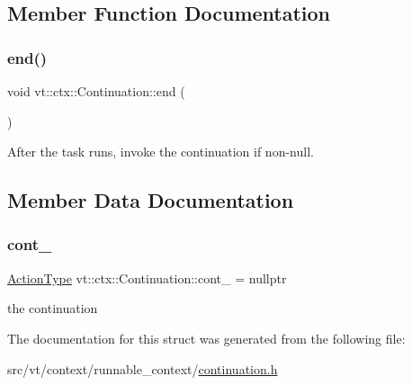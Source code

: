 \subsection{Member Function Documentation}
\mbox{\label{structvt_1_1ctx_1_1_continuation_abcfde5b28c25935a54d42a2aa5ba7de1}} 
\subsubsection{\texorpdfstring{end()}{end()}}
{\footnotesize\ttfamily void vt\+::ctx\+::\+Continuation\+::end (\begin{DoxyParamCaption}{ }\end{DoxyParamCaption})\hspace{0.3cm}{\ttfamily [inline]}}



After the task runs, invoke the continuation if non-\/null. 



\subsection{Member Data Documentation}
\mbox{\label{structvt_1_1ctx_1_1_continuation_aadaa0a147af8e8bba30684a098a5eb39}} 
\subsubsection{\texorpdfstring{cont\+\_\+}{cont\_}}
{\footnotesize\ttfamily \hyperlink{namespacevt_ae0a5a7b18cc99d7b732cb4d44f46b0f3}{Action\+Type} vt\+::ctx\+::\+Continuation\+::cont\+\_\+ = nullptr\hspace{0.3cm}{\ttfamily [private]}}

the continuation 

The documentation for this struct was generated from the following file\+:\begin{DoxyCompactItemize}
\item 
src/vt/context/runnable\+\_\+context/\hyperlink{continuation_8h}{continuation.\+h}\end{DoxyCompactItemize}
